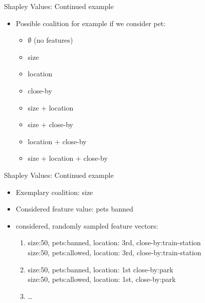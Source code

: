 \documentclass[aspectratio=169]{../latex_main/tntbeamer}  %
\begin{document}
\begin{frame}[c]{Shapley Values: Continued example}
	
	\begin{itemize}
	    \item Possible coalition for example if we consider \alert{pet}:
	    \begin{itemize}
	        \item $\emptyset$ (no features)
	        \item size
	        \item location
	        \item close-by
	        \item size + location
	        \item size + close-by
	        \item location + close-by
	        \item size + location + close-by
	    \end{itemize}
	    
	 \end{itemize}
\end{frame}

\begin{frame}[c]{Shapley Values: Continued example}
	
	\begin{itemize}
	    \item Exemplary coalition: size
	    \item Considered feature value: pets banned
	    \item considered, randomly sampled feature vectors:
	    \begin{enumerate}
	        \item size:50, pets:banned, location: 3rd, close-by:train-station\\
	        size:50, pets:allowed, location: 3rd, close-by:train-station\\
	        \item size:50, pets:banned, location: 1st close-by:park\\
	        size:50, pets:allowed, location: 1st, close-by:park\\
	        \item \ldots
	    \end{enumerate}
	 \end{itemize}
\end{frame}
\end{document}
